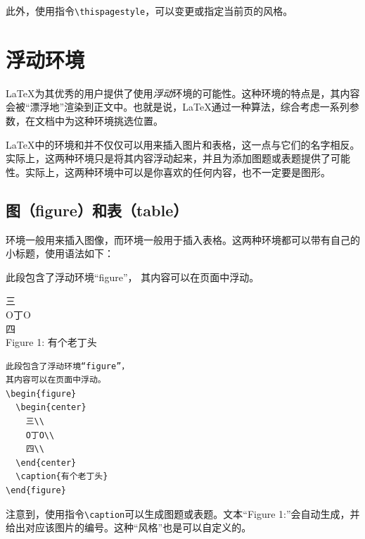 此外，使用指令\verb|\thispagestyle|，可以变更或指定当前页的风格。

\section{浮动环境}

\LaTeX 为其优秀的用户提供了使用\emph{浮动}环境的可能性。这种环境的特点是，其内容会被“漂浮地”渲染到正文中。也就是说，\LaTeX 通过一种算法，综合考虑一系列参数，在文档中为这种环境挑选位置。

\begin{exclamation}
\LaTeX 中的环境和并不仅仅可以用来插入图片和表格，这一点与它们的名字相反。实际上，这两种环境只是将其内容浮动起来，并且为添加图题或表题提供了可能性。实际上，这两种环境中可以是你喜欢的任何内容，也不一定要是图形。
\end{exclamation}

\subsection{图（figure）和表（table）}

环境一般用来插入图像，而环境一般用于插入表格。这两种环境都可以带有自己的小标题，使用语法如下：

\begin{codelist}[2.20]{
  此段包含了浮动环境“figure”，
其内容可以在页面中浮动。
  \begin{center}
三\\
O丁O\\
四\\
Figure 1: 有个老丁头
  \end{center}

}
\begin{verbatim}
此段包含了浮动环境“figure”，
其内容可以在页面中浮动。
\begin{figure}
  \begin{center}
    三\\
    O丁O\\
    四\\
  \end{center}
  \caption{有个老丁头}
\end{figure}\end{verbatim}
\end{codelist}

注意到，使用指令\verb|\caption|可以生成图题或表题。文本“Figure 1:”会自动生成，并给出对应该图片的编号。这种“风格”也是可以自定义的。

